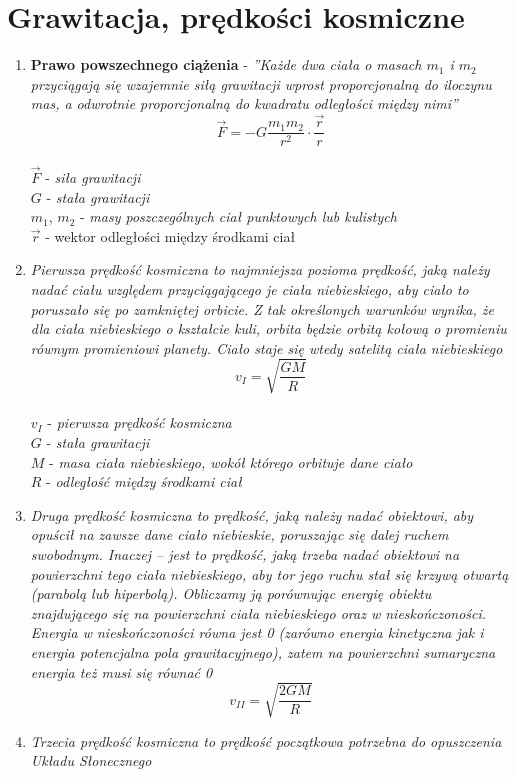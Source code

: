 \documentclass[12pt,twoside,a4paper]{book}
\begin{document}
\section{Grawitacja, prędkości kosmiczne}
\begin{enumerate}[label=(\alph*)]
\item\textbf{Prawo powszechnego ciążenia} - \textit{''Każde dwa ciała o masach $m_1$ i $m_2$ przyciągają się wzajemnie siłą grawitacji wprost proporcjonalną do iloczynu mas, a odwrotnie proporcjonalną do kwadratu odległości między nimi''}\\
$$\vec{F} = -G\frac{m_1 m_2}{r^2}\cdot\frac{\vec r}{r}$$\\
$\vec{F}$ - \textit{siła grawitacji}\\
$G$ - \textit{stała grawitacji}\\
$m_1$, $m_2$ - \textit{masy poszczególnych ciał punktowych lub kulistych}\\
$\vec r$ - wektor odległości między środkami ciał
\item\textit{Pierwsza prędkość kosmiczna to najmniejsza pozioma prędkość, jaką należy nadać ciału względem przyciągającego je ciała niebieskiego, aby ciało to poruszało się po zamkniętej orbicie. Z tak określonych warunków wynika, że dla ciała niebieskiego o kształcie kuli, orbita będzie orbitą kołową o promieniu równym promieniowi planety. Ciało staje się wtedy satelitą ciała niebieskiego}\\
$$v_I = \sqrt{\frac{GM}{R}}$$\\
$v_I$ - \textit{pierwsza prędkość kosmiczna}\\
$G$ - \textit{stała grawitacji}\\
$M$ - \textit{masa ciała niebieskiego, wokół którego orbituje dane ciało}\\
$R$ - \textit{odległość między środkami ciał}
\item\textit{Druga prędkość kosmiczna to prędkość, jaką należy nadać obiektowi, aby opuścił na zawsze dane ciało niebieskie, poruszając się dalej ruchem swobodnym. Inaczej – jest to prędkość, jaką trzeba nadać obiektowi na powierzchni tego ciała niebieskiego, aby tor jego ruchu stał się krzywą otwartą (parabolą lub hiperbolą). Obliczamy ją porównując energię obiektu znajdującego się na powierzchni ciała niebieskiego oraz w nieskończoności. Energia w nieskończoności równa jest 0 (zarówno energia kinetyczna jak i energia potencjalna pola grawitacyjnego), zatem na powierzchni sumaryczna energia też musi się równać 0}\\
$$v_{II} = \sqrt{\frac{2GM}{R}}$$
\item\textit{Trzecia prędkość kosmiczna to prędkość początkowa potrzebna do opuszczenia Układu Słonecznego}
\end{enumerate}
\end{document}
